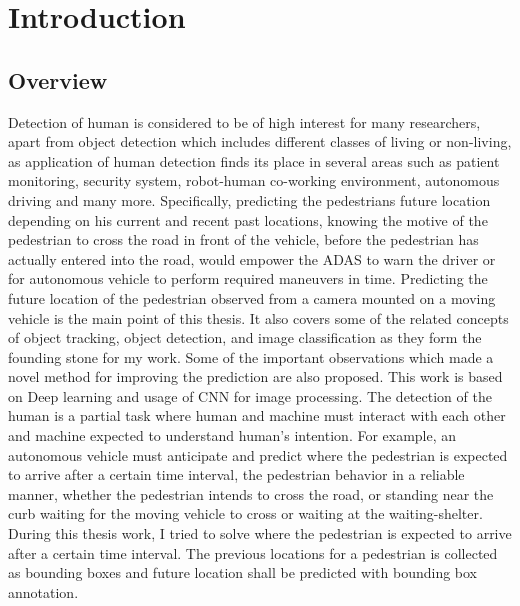 \pagestyle{fancy}
\fancyhf{}
\fancyhead[EL]{\leftmark} %
\fancyhead[OL]{\leftmark}
\fancyhead[ER,OR]{\thepage}

\setcounter{page}{1}

\chapter{Introduction}
\section{Overview}
Detection of human is considered to be of high interest for many researchers, apart from object detection which includes different classes of living or non-living, as application of human detection finds its place in several areas such as patient monitoring, security system, robot-human co-working environment, autonomous driving and many more. Specifically, predicting the pedestrians future 
location depending on his current and recent past locations, knowing the motive of the pedestrian to cross the road in front of the vehicle, before the pedestrian has actually entered into the road, would empower the ADAS to warn the driver or for autonomous vehicle to perform required maneuvers in time.
Predicting the future location of the pedestrian observed from a camera mounted on a moving vehicle is the main point of this thesis. It also covers some of the related concepts of object tracking, object detection, and image classification as they form the founding stone for my work. Some of the important observations which made a novel method for improving the prediction are also proposed. This work is based on Deep learning and usage of CNN for image processing. The detection of the human is a partial task where human and machine must interact with each other and machine expected to understand human's intention. For example, an autonomous vehicle must anticipate and predict where the pedestrian is expected to arrive after a certain time interval, the pedestrian behavior in a reliable manner, whether the pedestrian intends to cross the road, or standing near the curb waiting for the moving vehicle to cross or waiting at the waiting-shelter. During this thesis work, I tried to solve where the pedestrian is expected to arrive after a certain time interval. The previous locations for a pedestrian is collected as bounding boxes and future location shall be predicted with bounding box annotation.

